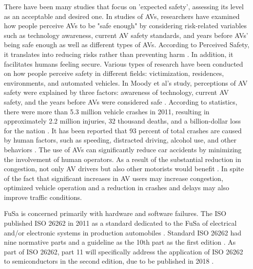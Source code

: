 \documentclass[a4paper,12pt]{article}
\begin{document}
\hspace{5mm} There have been many studies that focus on 'expected safety', assessing its level as an acceptable and desired one. In studies of AVs, researchers have examined how people perceive AVs to be "safe enough" by considering risk-related variables such as technology awareness, current AV safety standards, and years before AVs' being safe enough as well as different types of AVs. According to Perceived Safety, it translates into reducing risks rather than preventing harm \cite{article34}. In addition, it facilitates humans feeling secure. Various types of research have been conducted on how people perceive safety in different fields: victimization, residences, environments, and automated vehicles. In Moody et al's study, perceptions of AV safety were explained by three factors: awareness of technology, current AV safety, and the years before AVs were considered safe \cite{article34}. According to statistics, there were more than 5.3 million vehicle crashes in 2011, resulting in approximately 2.2 million injuries, 32 thousand deaths, and a billion-dollar loss for the nation \cite{article18}. It has been reported that 93 percent of total crashes are caused by human factors, such as speeding, distracted driving, alcohol use, and other behaviors \cite{article18}. The use of AVs can significantly reduce car accidents by minimizing the involvement of human operators. As a result of the substantial reduction in congestion, not only AV drivers but also other motorists would benefit \cite{article18}. In spite of the fact that significant increases in AV users may increase congestion, optimized vehicle operation and a reduction in crashes and delays may also improve traffic conditions.

\hspace{5mm} FuSa is concerned primarily with hardware and software failures. The ISO published ISO 26262 in 2011 as a standard dedicated to the FuSa of electrical and/or electronic systems in production automobiles \cite{article19}. Standard ISO 26262 had nine normative parts and a guideline as the 10th part as the first edition \cite{article19}. As part of ISO 26262, part 11 will specifically address the application of ISO 26262 to semiconductors in the second edition, due to be published in 2018 \cite{article19}. 
\end{document}
